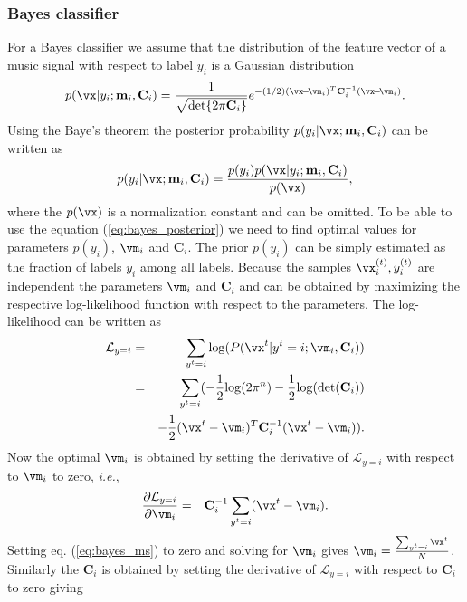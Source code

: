 \documentclass[aps,prb,10pt,twocolumn,groupedaddress]{revtex4-1}
\begin{document}
\subsubsection{Bayes classifier}
\label{sec:bayes_classifier}
For a Bayes classifier we assume that the distribution of the feature vector of
a music signal with respect to label $y_i$ is a Gaussian distribution
\begin{equation}
  p(\vx|y_i;\mathbf{m}_{i},\mathbf{C}_{i}) = \frac{1}{\sqrt{\det\{ 2 \pi \mathbf{C}_{i} \}}}e^{-(1/2) (\vx\!-\!\vm_{i})^{T} \mathbf{C}_{i}^{-1} (\vx\!-\!\vm_{i})}.
  \label{eq:bayes_gaussian_distribution}
\end{equation}
Using the Baye's theorem the posterior probability
$p(y_i|\vx;\mathbf{m}_{i},\mathbf{C}_{i})$ can be written as
\begin{equation}
  p(y_i|\vx;\mathbf{m}_{i},\mathbf{C}_{i}) = \frac{p(y_i)p(\vx|y_i;\mathbf{m}_{i},\mathbf{C}_{i})}{p(\vx)},
  \label{eq:bayes_posterior}
\end{equation}
where the $p(\vx)$ is a normalization constant and can be omitted. To be able to
use the equation (\ref{eq:bayes_posterior}) we need to find optimal values for
parameters $p(y_i)$, $\vm_i$ and $\mathbf{C}_i$. The prior $p(y_i)$ can be
simply estimated as the fraction of labels $y_i$ among all labels.
Because the samples ${\vx_i^{(t)}, y_i^{(t)}}$ are independent the parameters
$\vm_i$ and $\mathbf{C}_i$ and can be obtained by
maximizing the respective log-likelihood function with respect to the
parameters. The log-likelihood
can be written as
\begin{eqnarray}
  \mathcal{L}_{y=i}&=&\sum_{y^t=i}\mathrm{log}(P(\vx^t|y^t=i;\vm_i,\mathbf{C}_i))\nonumber\\
  &=&\sum_{y^t=i}(-\frac{1}{2}\mathrm{log}(2\pi^n)-\frac{1}{2}\mathrm{log}(\mathrm{det}(\mathbf{C}_i))\nonumber\\
  & &-\frac{1}{2}(\vx^t-\vm_i)^T\mathbf{C}_i^{-1}(\vx^t-\vm_i)).
\end{eqnarray}
Now the optimal $\vm_i$ is obtained by setting the derivative of
$\mathcal{L}_{y=i}$ with respect to $\vm_i$ to zero, \textit{i.e.},
\begin{eqnarray}
  \frac{\partial{\mathcal{L}_{y=i}}}{\partial\vm_i}&=&\mathbf{C}_i^{-1}\sum_{y^t=i}(\vx^t-\vm_i).
  \label{eq:bayes_ms}
\end{eqnarray}
Setting eq. (\ref{eq:bayes_ms}) to zero and solving for $\vm_i$ gives
$\vm_i=\frac{\sum_{y^t=i}\vx^t}{N}$. Similarly the
$\mathbf{C}_i$ is obtained  by setting the derivative of $\mathcal{L}_{y=i}$ with respect to $\mathbf{C}_i$ to zero giving
\end{document}
